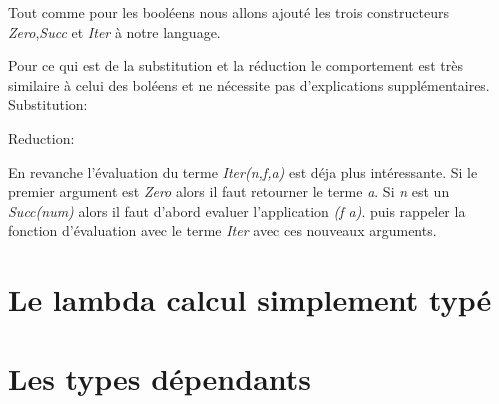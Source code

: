 \documentclass {article}
\newcommand{\codefrom}[3]
           {}
\theoremstyle{definition}
\theoremstyle{remark}
\begin{document}
Tout comme pour les booléens nous allons ajouté les trois constructeurs 
\emph{Zero},\emph{Succ} et \emph{Iter} à notre language.

\codefrom{untyped}{lambda}{nat_term}

Pour ce qui est de la substitution et la réduction le comportement est très
similaire à celui des boléens et ne nécessite pas d'explications supplémentaires.
Substitution:

\codefrom{untyped}{lambda}{nat_substitution}

Reduction:

\codefrom{untyped}{lambda}{nat_reduction}

En revanche l'évaluation du terme \emph{Iter(n,f,a)} est déja plus intéressante.
Si le premier argument est \emph{Zero} alors il faut retourner le terme \emph{a}.
Si \emph{n} est un \emph{Succ(num)} alors il faut d'abord evaluer l'application 
\emph{(f a)}. puis rappeler la fonction d'évaluation avec le terme 
\emph{Iter} avec ces nouveaux arguments.

\codefrom{untyped}{lambda}{nat_evaluation}

\section{Le lambda calcul simplement typé}

\section{Les types dépendants}







\end{document}
